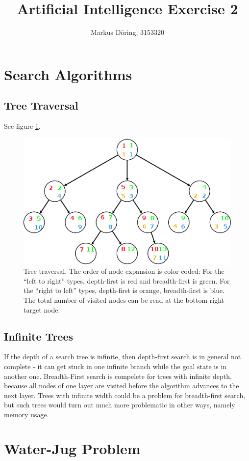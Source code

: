 \documentclass[11pt,a4paper]{scrartcl}
\begin{document}
\title{Artificial Intelligence Exercise 2}
\author{Markus Döring, 3153320}
\maketitle

\section{Search Algorithms}
\subsection{Tree Traversal}
See figure \ref{fig:search}.
\begin{figure}[ht]
 \includegraphics[width=.65\linewidth]{search.png}
 \caption{Tree traversal. The order of node expansion is color coded: For the ``left to right'' types, 
 depth-first is red and breadth-first is green. For the ``right to left'' types, depth-first is orange, 
 breadth-first is blue. The total number of visited nodes can be read at the bottom right target node.}
 \label{fig:search}
\end{figure}

\subsection{Infinite Trees}

If the depth of a search tree is infinite, then depth-first search is in general 
not complete - it can get stuck in one infinite branch while the goal state is 
in another one. Breadth-First search is compelete for trees with infinite depth, 
because all nodes of one layer are visited before the algorithm advances to the 
next layer. Trees with infinite width could be a problem for breadth-first search, 
but such trees would turn out much more problematic in other ways, namely memory 
usage.

\section{Water-Jug Problem}
\end{document}
